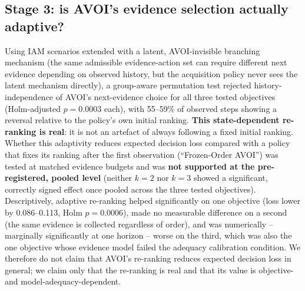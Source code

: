 \subsection{Stage 3: is AVOI's evidence selection actually adaptive?}
Using IAM scenarios extended with a latent, AVOI-invisible branching mechanism (the same admissible evidence-action
set can require different next evidence depending on observed history, but the acquisition policy never sees the
latent mechanism directly), a group-aware permutation test rejected history-independence of AVOI's next-evidence
choice for all three tested objectives (Holm-adjusted $p=0.0003$ each), with 55--59\% of observed steps showing a
reversal relative to the policy's own initial ranking. \textbf{This state-dependent re-ranking is real}: it is not an
artefact of always following a fixed initial ranking. Whether this adaptivity reduces expected decision loss compared
with a policy that fixes its ranking after the first observation (``Frozen-Order AVOI'') was tested at matched
evidence budgets and was \textbf{not supported at the pre-registered, pooled level} (neither $k=2$ nor $k=3$ showed a
significant, correctly signed effect once pooled across the three tested objectives). Descriptively, adaptive
re-ranking helped significantly on one objective (loss lower by 0.086--0.113, Holm $p=0.0006$), made no measurable
difference on a second (the same evidence is collected regardless of order), and was numerically -- marginally
significantly at one horizon -- worse on the third, which was also the one objective whose evidence model failed the
adequacy calibration condition. We therefore do not claim that AVOI's re-ranking reduces expected decision loss in
general; we claim only that the re-ranking is real and that its value is objective- and model-adequacy-dependent.

